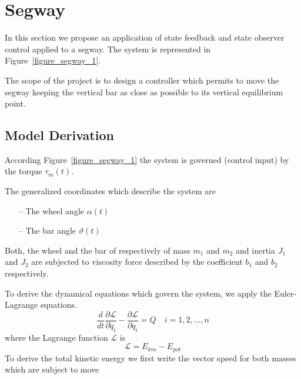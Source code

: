 \documentclass[11pt,a4paper,oneside]{book}
\numberwithin{equation}{section}
\theoremstyle{it}
\theoremstyle{definition}
\begin{document}
\section{Segway}
In this section we propose an application of state feedback and state observer 
control applied to a segway. The system is represented in 
Figure~\ref{figure_segway_1}. 

The scope of the project is to design a controller which permits to move the 
segway keeping the vertical bar as close as possible to its vertical 
equilibrium point.
\subsection{Model Derivation}
According Figure~\ref{figure_segway_1} the system is governed (control input) 
by the torque $\tau_m(t)$.

The generalized coordinates which describe the system are 
\begin{itemize}
	\item[--] The wheel angle $\alpha(t)$
	\item[--] The bar angle $\vartheta(t)$
\end{itemize}
Both, the wheel and the bar of respectively of mass $m_1$ and $m_2$ and inertia 
$J_1$ and $J_2$ are subjected to viscosity force described by the coefficient 
$b_1$ and $b_2$ respectively.

To derive the dynamical equations which govern the system, we apply the 
Euler-Lagrange equations.   
\begin{equation}\label{segway_eq_1}
	\frac{d}{dt}\frac{\partial \mathcal{L}}{\partial \dot{q}_i} - 
	\frac{\partial \mathcal{L}}{\partial q_i} = Q\quad i=1,2,\dots,n
\end{equation}
where the Lagrange function $\mathcal{L}$ is
\begin{equation}\label{segway_eq_2}
	\mathcal{L}=E_{kin}-E_{pot}
\end{equation}
To derive the total kinetic energy we first write the vector speed for both 
masses which are subject to move
\end{document}
